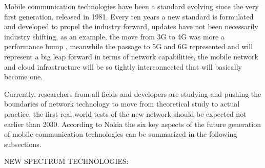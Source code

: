 

Mobile communication technologies have been a standard evolving since the very first
generation, released in 1981. Every ten years a new standard is formulated and
developed to propel the industry forward, updates have not been necessarily industry shifting, as an
example, the move from 3G to 4G was more a performance bump \cite{baeldung3g}, meanwhile the passage to 5G and 6G
represented and will represent a big leap forward in terms of network capabilities, the mobile
network and cloud infrastructure will be so tightly interconnected that will basically become one.

Currently, researchers from all fields and developers are studying and pushing the boundaries of
network technology to move from theoretical study to actual practice, the first real world tests of
the new network should be expected not earlier than 2030. According to Nokia\cite{nokiabell} the six
key aspects of the future generation of mobile communication technologies can be summarized in the
following subsections.

\bigskip
\noindent
NEW SPECTRUM TECHNOLOGIES:
\label{ssec:spectrum-technologies}

